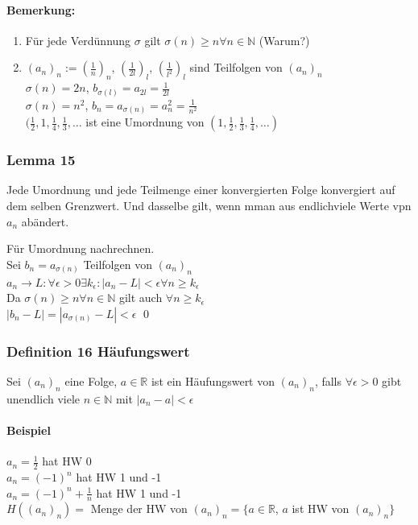 \documentclass[fleqn]{scrartcl}
\renewenvironment{proof}{{\bfseries Beweis }}{\qed}
\begin{document}
\paragraph{Bemerkung:}
\begin{enumerate}[1)]
\item Für jede Verdünnung $\sigma$ gilt $\sigma (n) \geq n \forall n \in \mathbb{N}$ (Warum?)
\item $(a_n)_n := (\frac{1}{n})_n$, $(\frac{1}{2l})_l$, $(\frac{1}{l^2})_l$ sind Teilfolgen von $(a_n)_n$\\
$\sigma(n) = 2n$, $b_{\sigma(l)} = a_{2l} = \frac{1}{2l}$\\
$\sigma(n) = n^2$, $b_n = a_{\sigma(n)} = a_n^2 = \frac{1}{n^2}$\\
$(\frac{1}{2}, 1, \frac{1}{4}, \frac{1}{3}, \ldots$ ist eine Umordnung von $(1, \frac{1}{2}, \frac{1}{3}, \frac{1}{4}, \ldots)$
\end{enumerate}
\subsubsection{Lemma 15} Jede Umordnung und jede Teilmenge einer konvergierten Folge konvergiert auf dem selben Grenzwert. Und dasselbe gilt, wenn mman aus endlichviele Werte vpn $a_n$ abändert.

\begin{proof}
Für Umordnung nachrechnen.\\
Sei $b_n = a_{\sigma(n)}$ Teilfolgen von $(a_n)_n$\\
$a_n \rightarrow L: \forall \epsilon > 0 \exists k_\epsilon: |a_n - L| < \epsilon \forall n \geq k_\epsilon$\\
Da $\sigma(n) \geq n \forall n \in \mathbb{N}$ gilt auch $\forall n \geq k_\epsilon$\\
$|b_n - L| = |a_{\sigma(n)} - L| < \epsilon$
\end{proof}
\subsubsection{Definition 16 Häufungswert}
Sei $(a_n)_n$ eine Folge, $a\in\mathbb{R}$ ist ein Häufungswert von $(a_n)_n$, falls $\forall \epsilon > 0$ gibt unendlich viele $n\in\mathbb{N}$ mit $|a_n - a| < \epsilon$
\paragraph{Beispiel} $a_n = \frac{1}{2}$ hat HW 0\\
$a_n = (-1)^n$ hat HW 1 und -1\\
$a_n = (-1)^n + \frac{1}{n}$ hat HW 1 und -1\\
$H((a_n)_n) = $ Menge der HW von $(a_n)_n = \{ a\in\mathbb{R}$, $a$ ist HW von $(a_n)_n\}$
\end{document}
